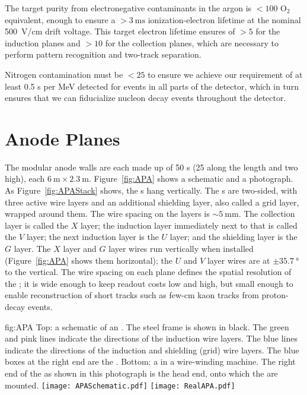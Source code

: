 The target purity from electronegative contaminants in the argon is $<\!\!100$  O$_{2}$ equivalent, enough to ensure a $>\!\!\SI{3}{\milli\second}$ ionization-electron lifetime at the nominal \SI{500}{\volt/\centi\meter} drift voltage. This target electron lifetime ensures  of $>5$ for the induction planes and $>10$ for the collection planes, which are necessary to perform pattern recognition and two-track separation. 

Nitrogen contamination must be $<\!25$  to ensure we achieve our requirement of at least 0.5 \phel{}s per MeV detected for events in all parts of the detector, which in turn ensures 
that we can fiducialize nucleon decay events throughout the detector.

\section{Anode Planes}
\label{sec:exec-sp-apa}

The modular anode walls are each made up of 50 s (25 along the  length and two high), each $\SI{6}{\meter}\times\SI{2.3}{\meter}$. Figure~\ref{fig:APA} shows a schematic and a photograph. As Figure~\ref{fig:APAStack} shows, the s hang vertically. The s are two-sided, with three active wire layers and an additional shielding layer, also called a grid layer, wrapped around them. The wire spacing on the layers is $\sim\!\SI{5}{\mm}$. The collection layer is called the $X$ layer; the induction layer immediately next to that is called the $V$ layer; the next induction layer is the $U$ layer; and the shielding layer is the $G$ layer. The $X$ layer and $G$ layer wires run vertically when installed  (Figure~\ref{fig:APA} shows them horizontal); the $U$ and $V$ layer wires are at $\pm\SI{35.7}{\degree}$ to the vertical. The 
wire spacing on each plane defines the spatial resolution of the ; it is wide enough to keep readout costs low and  high, but small enough to enable reconstruction of 
short tracks such as few-\si{\cm} kaon tracks from proton-decay events.

\begin{dunefigure}{fig:APA}
{Top: a schematic of an . The steel  frame is shown in black. The green and pink lines indicate the directions of the induction wire layers. The blue lines indicate the directions of the induction and shielding (grid) wire layers. The blue boxes at the right end  are the . Bottom: a   in a wire-winding machine. The right end of the  as shown in this photograph is the head end, onto which the  are mounted.}
\texttt{[image: APASchematic.pdf]}
\texttt{[image: RealAPA.pdf]}
\end{dunefigure}

